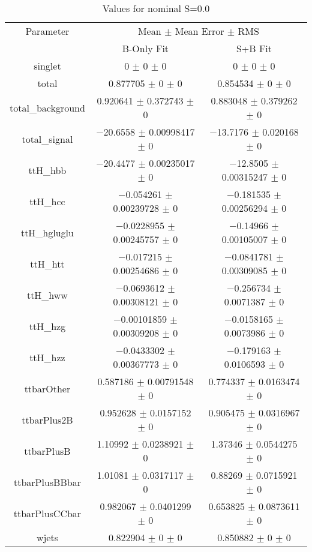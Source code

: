 \begin{table}
\centering
\caption{Values for nominal S=0.0}
\begin{tabular}{ccc}
\toprule
Parameter & \multicolumn{2}{c}{Mean $\pm$ Mean Error $\pm$ RMS}\\
 & B-Only Fit & S+B Fit\\
\midrule
singlet & \num{0} $\pm$ \num{0} $\pm$ \num{0} & \num{0} $\pm$ \num{0} $\pm$ \num{0}\\
total & \num{0.877705} $\pm$ \num{0} $\pm$ \num{0} & \num{0.854534} $\pm$ \num{0} $\pm$ \num{0}\\
total\_background & \num{0.920641} $\pm$ \num{0.372743} $\pm$ \num{0} & \num{0.883048} $\pm$ \num{0.379262} $\pm$ \num{0}\\
total\_signal & \num{-20.6558} $\pm$ \num{0.00998417} $\pm$ \num{0} & \num{-13.7176} $\pm$ \num{0.020168} $\pm$ \num{0}\\
ttH\_hbb & \num{-20.4477} $\pm$ \num{0.00235017} $\pm$ \num{0} & \num{-12.8505} $\pm$ \num{0.00315247} $\pm$ \num{0}\\
ttH\_hcc & \num{-0.054261} $\pm$ \num{0.00239728} $\pm$ \num{0} & \num{-0.181535} $\pm$ \num{0.00256294} $\pm$ \num{0}\\
ttH\_hgluglu & \num{-0.0228955} $\pm$ \num{0.00245757} $\pm$ \num{0} & \num{-0.14966} $\pm$ \num{0.00105007} $\pm$ \num{0}\\
ttH\_htt & \num{-0.017215} $\pm$ \num{0.00254686} $\pm$ \num{0} & \num{-0.0841781} $\pm$ \num{0.00309085} $\pm$ \num{0}\\
ttH\_hww & \num{-0.0693612} $\pm$ \num{0.00308121} $\pm$ \num{0} & \num{-0.256734} $\pm$ \num{0.0071387} $\pm$ \num{0}\\
ttH\_hzg & \num{-0.00101859} $\pm$ \num{0.00309208} $\pm$ \num{0} & \num{-0.0158165} $\pm$ \num{0.0073986} $\pm$ \num{0}\\
ttH\_hzz & \num{-0.0433302} $\pm$ \num{0.00367773} $\pm$ \num{0} & \num{-0.179163} $\pm$ \num{0.0106593} $\pm$ \num{0}\\
ttbarOther & \num{0.587186} $\pm$ \num{0.00791548} $\pm$ \num{0} & \num{0.774337} $\pm$ \num{0.0163474} $\pm$ \num{0}\\
ttbarPlus2B & \num{0.952628} $\pm$ \num{0.0157152} $\pm$ \num{0} & \num{0.905475} $\pm$ \num{0.0316967} $\pm$ \num{0}\\
ttbarPlusB & \num{1.10992} $\pm$ \num{0.0238921} $\pm$ \num{0} & \num{1.37346} $\pm$ \num{0.0544275} $\pm$ \num{0}\\
ttbarPlusBBbar & \num{1.01081} $\pm$ \num{0.0317117} $\pm$ \num{0} & \num{0.88269} $\pm$ \num{0.0715921} $\pm$ \num{0}\\
ttbarPlusCCbar & \num{0.982067} $\pm$ \num{0.0401299} $\pm$ \num{0} & \num{0.653825} $\pm$ \num{0.0873611} $\pm$ \num{0}\\
wjets & \num{0.822904} $\pm$ \num{0} $\pm$ \num{0} & \num{0.850882} $\pm$ \num{0} $\pm$ \num{0}\\
\bottomrule
\end{tabular}
\end{table}